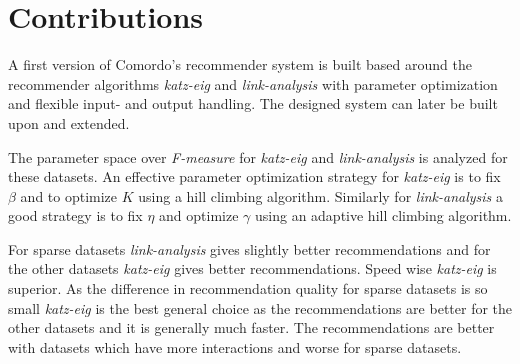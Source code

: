 
\section{Contributions}\label{sec:intro:contributions}

A first version of Comordo's recommender system is built based around the recommender algorithms \textit{katz-eig} and \textit{link-analysis} with parameter optimization and flexible input- and output handling. The designed system can later be built upon and extended.

The parameter space over \textit{F-measure} for \textit{katz-eig} and \textit{link-analysis} is analyzed for these datasets. An effective parameter optimization strategy for \textit{katz-eig} is to fix $\beta$ and to optimize $K$ using a hill climbing algorithm. Similarly for \textit{link-analysis} a good strategy is to fix $\eta$ and optimize $\gamma$ using an adaptive hill climbing algorithm.

For sparse datasets \textit{link-analysis} gives slightly better recommendations and for the other datasets \textit{katz-eig} gives better recommendations. Speed wise \textit{katz-eig} is superior. As the difference in recommendation quality for sparse datasets is so small \textit{katz-eig} is the best general choice as the recommendations are better for the other datasets and it is generally much faster.  The recommendations are better with datasets which have more interactions and worse for sparse datasets.



